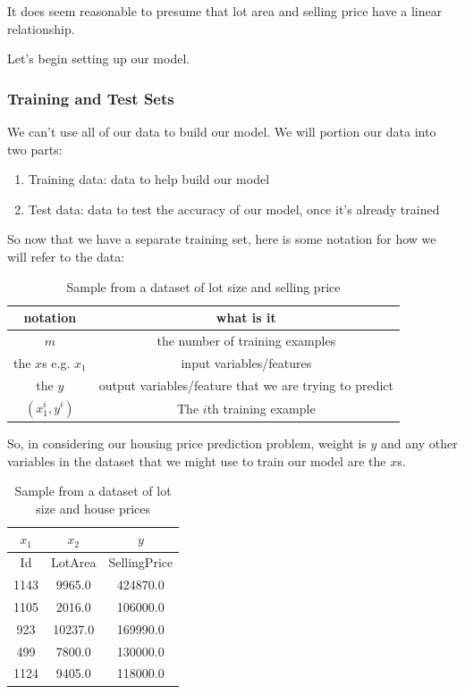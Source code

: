 \documentclass[12pt]{article}
\begin{document}
It does seem reasonable to presume that lot area and selling price have a linear relationship.

Let's begin setting up our model.

\subsubsection{Training and Test Sets}

We can't use all of our data to build our model. We will portion our data into two parts:

\begin{enumerate}
\item Training data: data to help build our model
\item Test data: data to test the accuracy of our model, once it's already trained
\end{enumerate}

So now that we have a separate training set, here is some notation for how we will refer to the data:
\begin{table}[htp]
\caption{Sample from a dataset of lot size and selling price}
\begin{center}
\begin{tabular}{|c|c|}
\hline
notation & what is it \\ \hline
$m$ & the number of training examples \\
the $x$s e.g. $x_1$ & input variables/features \\
the $y$ & output variables/feature that we are trying to predict \\
$(x_1^i, y^i)$ & The $i$th training example  \\
\hline
\end{tabular}
\end{center}
\label{table:sample-table-notaton}
\end{table}%

So, in considering our housing price prediction problem, weight is $y$ and any other variables in the dataset that we might use to train our model are the $x$s.

\begin{table}[htp]
\caption{Sample from a dataset of lot size and house prices}
\begin{center}
\begin{tabular}{|c|c|c|}
\hline
$x_1$ & $x_2$ & $y$ \\ \hline
Id & LotArea & SellingPrice  \\ \hline
1143 & 9965.0 & 424870.0 \\
1105 & 2016.0 & 106000.0 \\
923 & 10237.0 & 169990.0 \\
499& 7800.0 & 130000.0 \\
1124 & 9405.0 & 118000.0 \\
\hline
\end{tabular}
\end{center}
\label{table:house-prices-sample-table-xs}
\end{table}%
\end{document}
